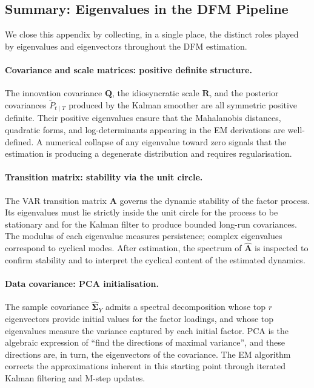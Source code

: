 \documentclass[11pt, a4paper, oneside]{article}
\begin{document}
\subsection{Summary: Eigenvalues in the DFM Pipeline}

We close this appendix by collecting, in a single place, the distinct
roles played by eigenvalues and eigenvectors throughout the DFM
estimation.

\paragraph{Covariance and scale matrices: positive definite structure.}
The innovation covariance $\mathbf{Q}$, the idiosyncratic scale
$\mathbf{R}$, and the posterior covariances
$\tilde{P}_{t \mid T}$ produced by the Kalman smoother are all
symmetric positive definite. Their positive eigenvalues ensure that
the Mahalanobis distances, quadratic forms, and log-determinants
appearing in the EM derivations are well-defined. A numerical
collapse of any eigenvalue toward zero signals that the estimation is
producing a degenerate distribution and requires regularisation.

\paragraph{Transition matrix: stability via the unit circle.}
The VAR transition matrix $\mathbf{A}$ governs the dynamic stability
of the factor process. Its eigenvalues must lie strictly inside the
unit circle for the process to be stationary and for the Kalman
filter to produce bounded long-run covariances. The modulus of each
eigenvalue measures persistence; complex eigenvalues correspond to
cyclical modes. After estimation, the spectrum of
$\widehat{\mathbf{A}}$ is inspected to confirm stability and to
interpret the cyclical content of the estimated dynamics.

\paragraph{Data covariance: PCA initialisation.}
The sample covariance
$\widehat{\boldsymbol{\Sigma}}_Y$ admits a spectral decomposition
whose top $r$ eigenvectors provide initial values for the factor
loadings, and whose top eigenvalues measure the variance captured by
each initial factor. PCA is the algebraic expression of ``find the
directions of maximal variance'', and these directions are, in turn,
the eigenvectors of the covariance. The EM algorithm corrects the
approximations inherent in this starting point through iterated
Kalman filtering and M-step updates.
\end{document}
